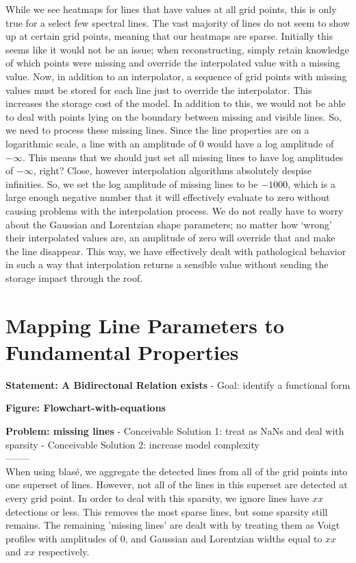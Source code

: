 \documentclass[twocolumn]{aastex631}
\begin{document}
While we see heatmaps for lines that have values at all grid points, this is only true for
a select few spectral lines. The vast majority of lines do not seem to show up at certain
grid points, meaning that our heatmaps are sparse. Initially this seems like it would not be an 
issue; when reconstructing, simply retain knowledge of which points were missing and override
the interpolated value with a missing value. Now, in addition to an
interpolator, a sequence of grid points with missing values must be stored for each line just to
override the interpolator. This increases the storage cost of the model. In addition to this, we would
not be able to deal with points lying on the boundary between missing and visible lines. So, we need
to process these missing lines. Since the line properties are on a logarithmic scale,
a line with an amplitude of 0 would have a log amplitude of $-\infty$. This means that we should just
set all missing lines to have log amplitudes of $-\infty$, right? Close, however interpolation
algorithms absolutely despise infinities. So, we set the log amplitude of missing lines to be
$-1000$, which is a large enough negative number that it will effectively evaluate to zero without
causing problems with the interpolation process. We do not really have to worry about the Gaussian
and Lorentzian shape parameters; no matter how `wrong' their interpolated values are, an amplitude of
zero will override that and make the line disappear. This way, we have effectively dealt with
pathological behavior in such a way that interpolation returns a sensible value without sending
the storage impact through the roof.

\section{Mapping Line Parameters to Fundamental Properties}
\begin{mdframed}
    \textbf{Statement: A Bidirectonal Relation exists}
    - Goal: identify a functional form
    \textcolor{lightgray}{\blindtext}
\end{mdframed}

\begin{mdframed}
    \textbf{Figure: Flowchart-with-equations}
\end{mdframed}

\begin{mdframed}
    \textbf{Problem: missing lines}
    - Conceivable Solution 1: treat as NaNs and deal with sparsity
    - Conceivable Solution 2: increase model complexity
    \\--------\\
    When using blas\'e, we aggregate the detected lines from all of the grid points
    into one superset of lines. However, not all of the lines in this superset are
    detected at every grid point. In order to deal with this sparsity, we ignore lines
    have $xx$ detections or less. This removes the most sparse lines, but some sparsity still
    remains. The remaining 'missing lines' are dealt with by treating them as Voigt profiles
    with amplitudes of 0, and Gaussian and Lorentzian widths equal to $xx$ and $xx$ respectively.
\end{mdframed}
\end{document}
